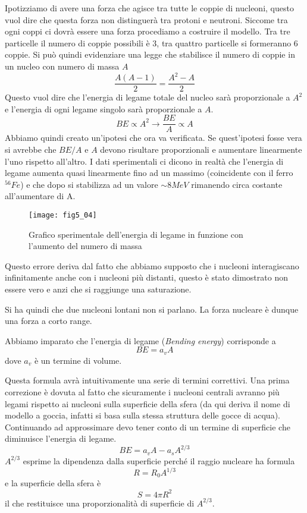 Ipotizziamo di avere una forza che agisce tra tutte le coppie di nucleoni, questo vuol dire che questa forza non distinguerà tra protoni e neutroni.
Siccome tra ogni coppi ci dovrà essere una forza procediamo a costruire il modello.
Tra tre particelle il numero di coppie possibili è 3, tra quattro particelle si formeranno 6 coppie. 
Si può quindi evidenziare una legge che stabilisce il numero di coppie in un nucleo con numero di massa $A$
\begin{equation}
\frac{A(A-1)}{2}=\frac{A^2-A}{2}
\end{equation}
Questo vuol dire che l'energia di legame totale del nucleo sarà proporzionale a $A^2$ e l'energia di ogni legame singolo sarà proporzionale a $A$.
\begin{equation}
BE\propto A^2\to \frac{BE}{A}\propto A
\end{equation}
Abbiamo quindi creato un'ipotesi che ora va verificata.
Se quest'ipotesi fosse vera si avrebbe che $BE/A$ e $A$ devono risultare proporzionali e aumentare linearmente l'uno rispetto all'altro.
I dati sperimentali ci dicono in realtà che l'energia di legame aumenta quasi linearmente fino ad un massimo (coincidente con il ferro $^{56}Fe$) e che dopo si stabilizza ad un valore $\sim 8MeV$ rimanendo circa costante all'aumentare di A.
\begin{figure}[h]
\centering
\texttt{[image: fig5\_04]}
\caption{Grafico sperimentale  dell'energia di legame in funzione con l'aumento del numero di massa}
\end{figure}

Questo errore deriva dal fatto che abbiamo supposto che i nucleoni interagiscano infinitamente anche con i nucleoni più distanti, questo è stato dimostrato non essere vero e anzi che si raggiunge una saturazione.

Si ha quindi che due nucleoni lontani non si parlano.
La forza nucleare è dunque una forza a corto range.

Abbiamo imparato che l'energia di legame (\emph{Bending energy}) corrisponde a 
\begin{equation}
BE=a_vA
\end{equation}
dove $a_v$ è un termine di volume.

Questa formula avrà intuitivamente una serie di termini correttivi. 
Una prima correzione è dovuta al fatto che sicuramente i nucleoni centrali avranno più legami rispetto ai nucleoni sulla superficie della sfera (da qui deriva il nome di modello a goccia, infatti si basa sulla stessa struttura delle gocce di acqua).
Continuando ad approssimare devo tener conto di un termine di superficie che diminuisce l'energia di legame.
\begin{equation}
BE=a_vA-a_sA^{2/3}
\end{equation}
$A^{2/3}$ esprime la dipendenza dalla superficie perché il raggio nucleare ha formula
\[
R=R_0A^{1/3}
\]
e la superficie della sfera è
\[
S=4\pi R^2
\]
il che restituisce una proporzionalità di superficie di $A^{2/3}$.

